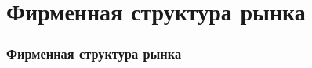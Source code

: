 \section{Фирменная структура рынка}

\begin{frame}
    \frametitle{Фирменная структура рынка}
\end{frame}
